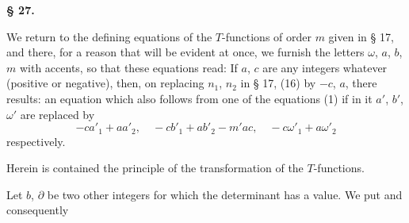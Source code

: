 \begin{center}

\textbf{}
\end{center}

\noindent\hrulefill

\begin{center}
\textbf{§ 27. }
\end{center}

We return to the defining equations of the $T$-functions of
order $m$ given in § 17, and there, for a reason that will be evident
at once, we furnish the letters $\omega$, $a$, $b$, $m$
with accents, so that these equations read:
If $a$, $c$ are any integers whatever (positive or negative),
then, on replacing $n_1$, $n_2$ in § 17, (16) by $-c$, $a$, there results:
an equation which also follows from one of the equations (1)
if in it $a'$, $b'$, $\omega'$ are replaced by
\[
-ca'_1+aa'_2,\quad -cb'_1+ab'_2-m'ac,\quad -c\omega'_1+a\omega'_2
\]
respectively.

Herein is contained the principle of the transformation of the
$T$-functions.

Let $b$, $\partial$ be two other integers for which the
determinant
has a  value. We put
and consequently
